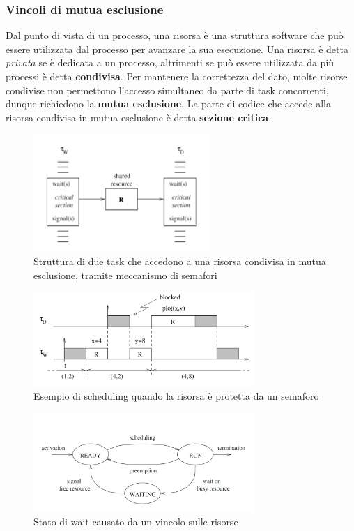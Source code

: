 \documentclass[12pt,openany,onesided]{book}
\begin{document}
\subsubsection{Vincoli di mutua esclusione}
Dal punto di vista di un processo, una risorsa è una struttura software che può essere utilizzata dal processo per avanzare la sua esecuzione.
Una risorsa è detta \textit{privata} se è dedicata a un processo, altrimenti se può essere utilizzata da più processi è detta \textbf{condivisa}.
Per mantenere la correttezza del dato, molte risorse condivise non permettono l'accesso simultaneo da parte di task concorrenti, dunque richiedono la \textbf{mutua esclusione}.
La parte di codice che accede alla risorsa condivisa in mutua esclusione è detta \textbf{sezione critica}.
\begin{figure}[H]
    \centering
    \includegraphics[width=0.60\textwidth]{pictures/strutturaSezioneCritica.png}
    \caption{Struttura di due task che accedono a una risorsa condivisa in mutua esclusione, tramite meccanismo di semafori}
\end{figure}
\begin{figure}[H]
    \centering
    \includegraphics[width=0.75\textwidth]{pictures/schedulingCorsaCritica.png}
    \caption{Esempio di scheduling quando la risorsa è protetta da un semaforo}
\end{figure}
\begin{figure}[H]
    \centering
    \includegraphics[width=0.75\textwidth]{pictures/cicloWait.png}
    \caption{Stato di wait causato da un vincolo sulle risorse}
\end{figure}
\end{document}
